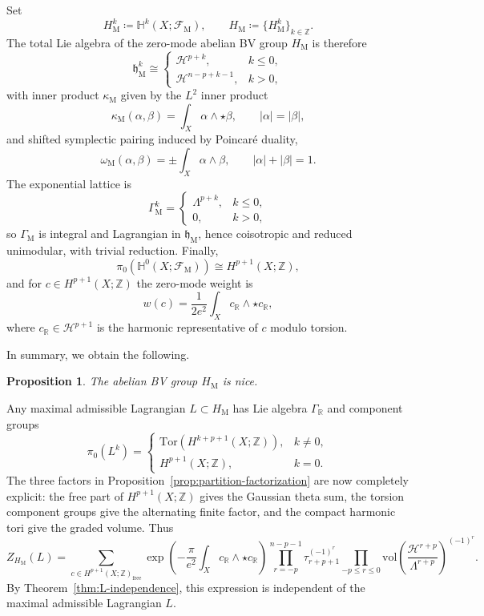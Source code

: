 \documentclass[12pt]{amsart}
\numberwithin{table}{section}
\numberwithin{equation}{section}
\newtheorem{prop}{Proposition}[section]
\theoremstyle{plain}
\newcommand{\fh}{\mathfrak{h}}
\newcommand{\sF}{\mathcal{F}}
\newcommand{\sH}{\mathcal{H}}
\newcommand{\R}{\mathbb{R}}
\newcommand{\Hq}{\mathbb{H}}
\newcommand{\Z}{\mathbb{Z}}
\newcommand{\Tor}{\mathrm{Tor}}
\newcommand{\vol}{\mathrm{vol}}
\begin{document}
Set
\[
H_{\mathrm M}^k\coloneq\mathbb H^k(X;\sF_{\mathrm M}),
\qquad H_{\mathrm M}\coloneq\{H_{\mathrm M}^k\}_{k\in\Z}.
\]
The total Lie algebra of the zero-mode abelian BV group $H_{\mathrm M}$ is therefore
\[
\fh_{\mathrm M}^k\cong
\begin{cases}
\mathcal H^{p+k},&k \leq 0,\\
\mathcal H^{n-p+k-1},&k >0,
\end{cases}
\]
with inner product $\kappa_{\mathrm M}$ given by the $L^2$ inner product
\[
\kappa_{\mathrm M}(\alpha,\beta)= \int_X\alpha\wedge \star \beta,
\qquad |\alpha|=|\beta|,
\]
and shifted symplectic pairing induced by Poincar\'e duality,
\[
\omega_{\mathrm M}(\alpha,\beta)= \pm \int_X\alpha\wedge\beta,
\qquad |\alpha|+|\beta|=1.
\]
The exponential lattice is
\[
\Gamma_{\mathrm M}^k=
\begin{cases}
\Lambda^{p+k},& k \leq 0,\\
0,&k >0,
\end{cases}
\]
so $\Gamma_{\mathrm M}$ is integral and Lagrangian in $\fh_{\mathrm M}$, hence coisotropic and reduced unimodular, with trivial reduction. Finally,
\[
\pi_0(\Hq^0(X;\sF_{\mathrm M})) \cong H^{p+1}(X;\Z),
\]
and for $c\in H^{p+1}(X;\Z)$ the zero-mode weight is
\[
w(c)
=
\frac{1}{2e^2}\int_X c_\R \wedge \star c_\R,
\]
where $c_\R\in\mathcal H^{p+1}$ is the harmonic representative of $c$ modulo torsion. 

In summary, we obtain the following.
\begin{prop}
	The abelian BV group $H_{\mathrm M}$ is nice.
\end{prop}

Any maximal admissible Lagrangian $L\subset H_{\mathrm M}$ has Lie algebra $\Gamma_{\mathbb R}$ and component groups
\[
\pi_0(L^k)=
\begin{cases}
	\Tor (H^{k+p+1}(X;\Z)), & k\neq 0,\\[2mm]
	H^{p+1}(X;\Z), & k=0.
\end{cases}
\]
The three factors in Proposition~\ref{prop:partition-factorization} are now completely explicit: the free part of $H^{p+1}(X;\Z)$ gives the Gaussian theta sum, the torsion component groups give the alternating finite factor, and the compact harmonic tori give the graded volume. Thus
\begin{equation}\label{eq:maxwell-partition}
Z_{H_{\mathrm{M}}}(L)
=
\sum_{c\in H^{p+1}(X;\Z)_{\mathrm{free}}}
\exp\!\left(-\frac{\pi}{e^2}
\int_X c_\R \wedge \star c_\R
\right)
\prod_{r=-p}^{n-p-1}
\tau_{r+p+1}^{(-1)^{r}}
\prod_{-p \leq r \leq 0} \vol\left(\frac{\sH^{r+p}}{\Lambda^{r+p}}\right)^{(-1)^r}.
\end{equation}
By Theorem~\ref{thm:L-independence}, this expression is independent of the maximal admissible Lagrangian $L$.
\end{document}

